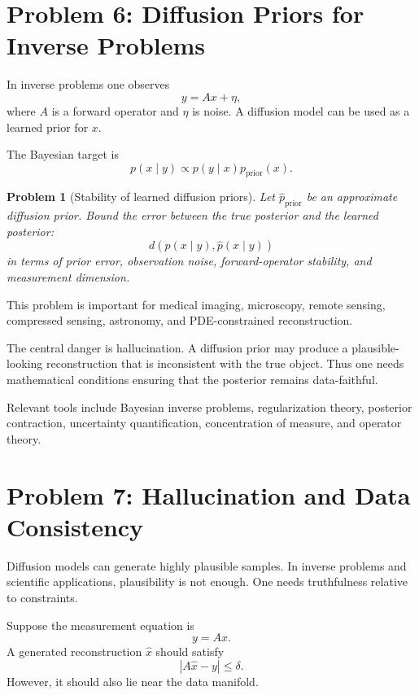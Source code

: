 \documentclass[11pt]{article}
\newtheorem{problem}{Problem}
\begin{document}
\section{Problem 6: Diffusion Priors for Inverse Problems}

In inverse problems one observes
\begin{equation}
y = A x + \eta,
\end{equation}
where $A$ is a forward operator and $\eta$ is noise. A diffusion model can be used as a learned prior for $x$.

The Bayesian target is
\begin{equation}
p(x\mid y) \propto p(y\mid x)p_{\mathrm{prior}}(x).
\end{equation}

\begin{problem}[Stability of learned diffusion priors]
Let $\widehat{p}_{\mathrm{prior}}$ be an approximate diffusion prior. Bound the error between the true posterior and the learned posterior:
\begin{equation}
d\left(
p(x\mid y),
\widehat{p}(x\mid y)
\right)
\end{equation}
in terms of prior error, observation noise, forward-operator stability, and measurement dimension.
\end{problem}

This problem is important for medical imaging, microscopy, remote sensing, compressed sensing, astronomy, and PDE-constrained reconstruction.

The central danger is hallucination. A diffusion prior may produce a plausible-looking reconstruction that is inconsistent with the true object. Thus one needs mathematical conditions ensuring that the posterior remains data-faithful.

Relevant tools include Bayesian inverse problems, regularization theory, posterior contraction, uncertainty quantification, concentration of measure, and operator theory.

\section{Problem 7: Hallucination and Data Consistency}

Diffusion models can generate highly plausible samples. In inverse problems and scientific applications, plausibility is not enough. One needs truthfulness relative to constraints.

Suppose the measurement equation is
\begin{equation}
y = A x.
\end{equation}
A generated reconstruction $\widehat{x}$ should satisfy
\begin{equation}
|A\widehat{x}-y| \leq \delta.
\end{equation}
However, it should also lie near the data manifold.
\end{document}
